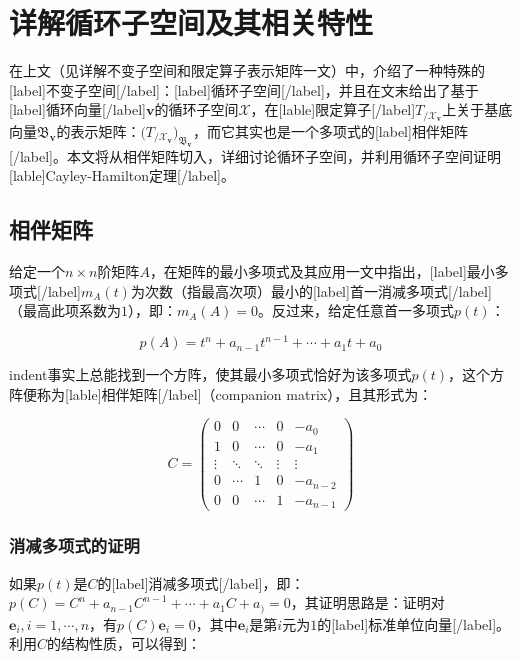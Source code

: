 \documentclass[UTF8,nofonts]{ctexart}
\begin{document}

\section*{详解循环子空间及其相关特性}

在上文（见详解不变子空间和限定算子表示矩阵一文）中，介绍了一种特殊的[label]不变子空间[/label]：[label]循环子空间[/label]，并且在文末给出了基于[label]循环向量[/label]$\boldsymbol{v}$的循环子空间$\mathcal{X}$，在[lable]限定算子[/label]$T_{/\mathcal{X}_{\boldsymbol{v}}}$上关于基底向量$\mathfrak{B}_{\boldsymbol{v}}$的表示矩阵：$\big(T_{/\mathcal{X}_{\boldsymbol{v}}}\big)_{\mathfrak{B}_{\boldsymbol{v}}}$，而它其实也是一个多项式的[label]相伴矩阵[/label]。本文将从相伴矩阵切入，详细讨论循环子空间，并利用循环子空间证明[lable]Cayley-Hamilton定理[/label]。

\subsection*{相伴矩阵}

给定一个$n \times n$阶矩阵$A$，在矩阵的最小多项式及其应用一文中指出，[label]最小多项式[/label]$m_A(t)$为次数（指最高次项）最小的[label]首一消减多项式[/label]（最高此项系数为$1$），即：$m_A(A)=0$。反过来，给定任意首一多项式$p(t)$：

\[
p(A)=t^n+a_{n-1}t^{n-1}+\cdots+a_1t+a_0
\]

indent事实上总能找到一个方阵，使其最小多项式恰好为该多项式$p(t)$，这个方阵便称为[lable]相伴矩阵[/label]（companion matrix），且其形式为：

\begin{equation}
\label{eq:cmat}
C=\begin{pmatrix}
0&0&\cdots&0&-a_0\\
1&0&\cdots&0&-a_1\\
\vdots&\ddots&\ddots&\vdots&\vdots\\
0&\cdots&1&0&-a_{n-2}\\
0&0&\cdots&1&-a_{n-1}
\end{pmatrix}
\end{equation}

\subsubsection*{消减多项式的证明}

如果$p(t)$是$C$的[label]消减多项式[/label]，即：$p(C)=C^n+a_{n-1}C^{n-1}+\cdots+a_1C+a_)=0$，其证明思路是：证明对$\boldsymbol{e}_i,i=1,\cdots,n$，有$p(C)\boldsymbol{e}_i=0$，其中$\boldsymbol{e}_i$是第$i$元为$1$的[label]标准单位向量[/label]。利用$C$的结构性质，可以得到：
\end{document}

